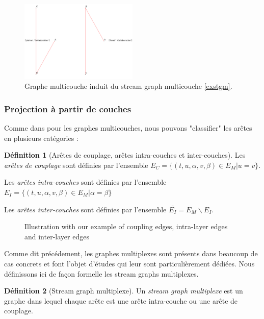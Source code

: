 \documentclass[11pt,a4paper]{article}
\theoremstyle{definition}
\newtheorem{defn}{Définition}
\theoremstyle{remark}
\theoremstyle{remark}
\def \stgm {stream graph multicouche}
\begin{document}
    \begin{figure}[H]
    	\centering
    	\includegraphics[width=0.5\textwidth]{extrt010.png}
    	\caption{Graphe multicouche induit du \stgm{} \ref{exstgm}.}
    \end{figure}
	


\subsubsection{Projection à partir de couches}
Comme dans \cite{mlkiv} pour les graphes multicouches, nous pouvons "classifier" les arêtes en plusieurs catégories :
	
	\begin{defn}[Arêtes de couplage, arêtes intra-couches et inter-couches]

   	Les {\em arêtes de couplage} sont définies par l'ensemble $E_C=\{(t,u,\alpha,v,\beta)\in E_M | u=v\}$.

    Les {\em arêtes intra-couches} sont définies par l'ensemble $E_I = \{(t,u,\alpha,v,\beta) \in E_M | \alpha = \beta \}$

    Les {\em arêtes inter-couches} sont définies par l'ensemble $\bar{E_I} = E_M\backslash E_I$.
    
	
	\end{defn}	
	
	\begin{figure}[h]
		\centering
		\caption{Illustration with our example of coupling edges, intra-layer edges and inter-layer edges}
		\label{exIntraInter}
	\end{figure}
	
	
	Comme dit précédement, les graphes multiplexes sont présents dans beaucoup de cas concrets et font l'objet d'études qui leur sont particulièrement dédiées. Nous définissons ici de façon formelle les stream graphs multiplexes.
	
	\begin{defn}[Stream graph multiplexe]	
	Un {\em stream graph multiplexe} est un graphe dans lequel chaque arête est une arête intra-couche ou une arête de couplage.
	\end{defn}
	
\end{document}
